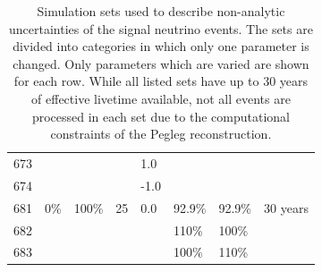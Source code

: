 \begin{landscape}
\begin{table}[]
\begin{tabular}{@{}llllllll@{}}
673        &                     &         &          & 1.0           &            &            &          \\
674        &                     &         &          & -1.0          &            &            &          \\ \midrule
681        & 0\%                 & 100\%   & 25       & 0.0           & 92.9\%     & 92.9\%     & 30 years \\
682        &                     &         &          &               & 110\%      & 100\%      &          \\
683        &                     &         &          &               & 100\%      & 110\%      &         
\end{tabular}
\caption[Available systematics simulation sets for GENIE]{Simulation sets used to describe non-analytic uncertainties of the signal neutrino events. The sets are divided into categories in which only one parameter is changed. Only parameters which are varied are shown for each row. While all listed sets have up to 30 years of effective livetime available, not all events are processed in each set due to the computational constraints of the Pegleg reconstruction.}
\label{table:geniesets}
\end{table}
\end{landscape}



